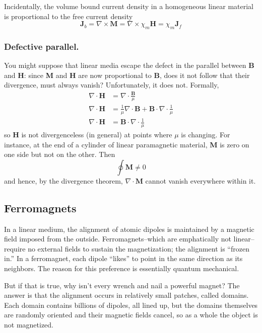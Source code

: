 \documentclass[../../../main.tex]{subfiles}
\begin{document}
Incidentally, the volume bound current density in a homogeneous linear material is proportional to the free current density
\begin{equation*}
    \mathbf{J}_b=\nabla\times \mathbf{M}=\nabla\times \chi_m \mathbf{H}=\chi_m\mathbf{J}_f
\end{equation*}

\subsubsection*{Defective parallel.} You might suppose that linear media escape the defect in the parallel between \textbf{B} and \textbf{H}: since \textbf{M} and \textbf{H} are now proportional to \textbf{B}, does it not follow that their divergence, must always vanish? Unfortunately, it does not. Formally,
\begin{align*}
    \nabla\cdot\mathbf{H}&= \nabla\cdot\frac{\mathbf{B}}{\mu}\\
    \nabla\cdot\mathbf{H}&=\frac{1}{\mu}\nabla\cdot\mathbf{B}+\mathbf{B}\cdot\nabla\cdot\frac{1}{\mu}\\
    \nabla\cdot\mathbf{H}&=\mathbf{B}\cdot\nabla\cdot\frac{1}{\mu}
\end{align*}
so \textbf{H} is not divergenceless (in general) at points where $\mu$ is changing. For instance, at the end of a cylinder of linear paramagnetic material, \textbf{M} is zero on one side but not on the other. Then 
\begin{equation*}
    \oint\mathbf{M}\neq 0
\end{equation*}
and hence, by the divergence theorem, $\nabla\cdot\mathbf{M}$ cannot vanish everywhere within it.

\subsection*{Ferromagnets}
In a linear medium, the alignment of atomic dipoles is maintained by a magnetic ﬁeld imposed from the outside. Ferromagnets--which are emphatically not linear--require no external ﬁelds to sustain the magnetization; the alignment is “frozen in.” In a ferromagnet, each dipole “likes” to point in the same direction as its neighbors. The reason for this preference is essentially quantum mechanical. 

But if that is true, why isn’t every wrench and nail a powerful magnet? The answer is that the alignment occurs in relatively small patches, called domains. Each domain contains billions of dipoles, all lined up, but the domains themselves are randomly oriented and their magnetic ﬁelds cancel, so as a whole the object is not magnetized.
\end{document}
